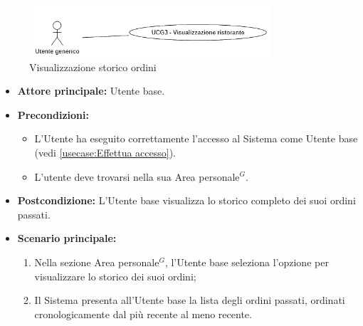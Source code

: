 \label{usecase:Storico ordini}

\begin{figure}[h]
	\centering
	\includegraphics[width=0.8\textwidth]{./uml/UCG3.png} 
	\caption{Visualizzazione storico ordini}
	\label{fig:UCG3}
  \end{figure}

\begin{itemize}
	\item \textbf{Attore principale:} Utente base.

	\item \textbf{Precondizioni:}
	      \begin{itemize}
		      \item L'Utente ha eseguito correttamente l'accesso al Sistema come Utente base (vedi \autoref{usecase:Effettua accesso}).
		      \item L'utente deve trovarsi nella sua Area personale$^G$.
	      \end{itemize}

	\item \textbf{Postcondizione:} L'Utente base visualizza lo storico completo dei suoi ordini passati.

	\item \textbf{Scenario principale:}
	      \begin{enumerate}
		      \item Nella sezione Area personale$^G$, l'Utente base seleziona l'opzione per visualizzare lo storico dei suoi ordini;
		      \item Il Sistema presenta all'Utente base la lista degli ordini passati, ordinati cronologicamente dal più recente al meno recente.
	      \end{enumerate}
\end{itemize}

